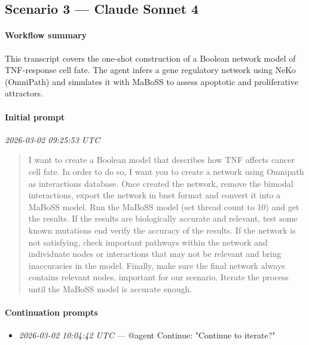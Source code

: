 \subsection{Scenario 3 — Claude Sonnet 4}

\paragraph{Workflow summary}
This transcript covers the one-shot construction of a Boolean network model of TNF-response cell fate. The agent infers a gene regulatory network using NeKo (OmniPath) and simulates it with MaBoSS to assess apoptotic and proliferative attractors.

\paragraph{Initial prompt} \hfill \textit{\small 2026-03-02 09:25:53 UTC}
\begin{quote}
I want to create a Boolean model that describes how TNF affects cancer cell fate. In order to do so, I want you to create a network using Omnipath as interactions database.
Once created the network, remove the bimodal interactions, export the network in bnet format and convert it into a MaBoSS model. Run the MaBoSS model (set thread count to 10) and get the results. If the results are biologically accurate and relevant, test some known mutations end verify the accuracy of the results. If the network is not satisfying, check important pathways within the network and individuate nodes or interactions that may not be relevant and bring inaccuracies in the model. Finally, make sure the final network always contains relevant nodes, important for our scenario.
Iterate the process until the MaBoSS model is accurate enough.
\end{quote}

\paragraph{Continuation prompts}
\begin{itemize}
\item \textit{\small 2026-03-02 10:04:42 UTC} --- @agent Continue: "Continue to iterate?"
\end{itemize}

